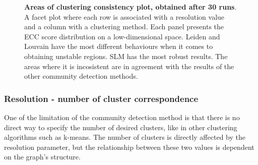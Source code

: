 \begin{figure}[H]
    \centering
    \caption{\label{fig:ca-clust-dif-facet}\textbf{Areas of clustering consistency plot, obtained after 30 runs}. A facet plot where each row is associated with a resolution value and a column with a clustering method. Each panel presents the ECC score distribution on a low-dimensional space. Leiden and Louvain have the most different behaviours when it comes to obtaining unstable regions. SLM has the most robust results. The areas where it is incosistent are in agreement with the results of the other community detection methods.}
\end{figure}

\subsubsection{Resolution - number of cluster correspondence}
One of the limitation of the community detection method is that there is no direct way to specify the number of desired clusters, like in other clustering algorithms such as k-means. The number of clusters is directly affected by the resolution parameter, but the relationship between these two values is dependent on the graph's structure.

